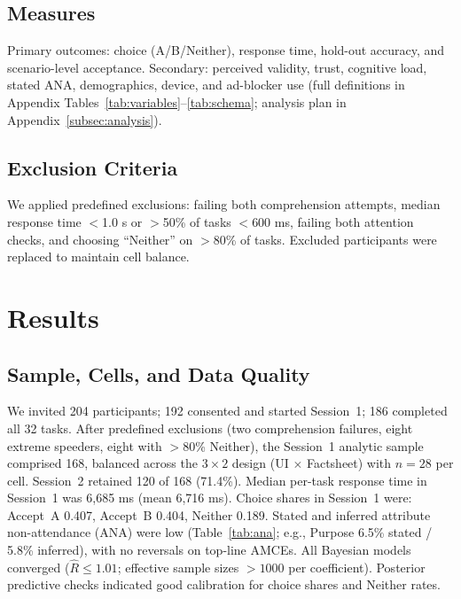 \documentclass{eusset}
\begin{document}
\subsection{Measures}
Primary outcomes: choice (A/B/Neither), response time, hold-out accuracy, and scenario-level acceptance. Secondary: perceived validity, trust, cognitive load, stated ANA, demographics, device, and ad-blocker use (full definitions in Appendix Tables~\ref{tab:variables}--\ref{tab:schema}; analysis plan in Appendix~\ref{subsec:analysis}).

\subsection{Exclusion Criteria}
We applied predefined exclusions: failing both comprehension attempts, median response time $<$1.0 s or $>$50\% of tasks $<$600 ms, failing both attention checks, and choosing ``Neither'' on $>$80\% of tasks. Excluded participants were replaced to maintain cell balance.

\section{Results}
\label{sec:results}

\subsection{Sample, Cells, and Data Quality}
We invited 204 participants; 192 consented and started Session~1; 186 completed all 32 tasks. After predefined exclusions (two comprehension failures, eight extreme speeders, eight with $>$80\% Neither), the Session~1 analytic sample comprised 168, balanced across the $3\times2$ design (UI $\times$ Factsheet) with $n{=}28$ per cell. Session~2 retained 120 of 168 (71.4\%). Median per-task response time in Session~1 was 6{,}685 ms (mean 6{,}716 ms). Choice shares in Session~1 were: Accept~A 0.407, Accept~B 0.404, Neither 0.189. Stated and inferred attribute non-attendance (ANA) were low (Table~\ref{tab:ana}; e.g., Purpose 6.5\% stated / 5.8\% inferred), with no reversals on top-line AMCEs. All Bayesian models converged ($\hat{R}\le 1.01$; effective sample sizes $>\!1000$ per coefficient). Posterior predictive checks indicated good calibration for choice shares and Neither rates.
\end{document}
